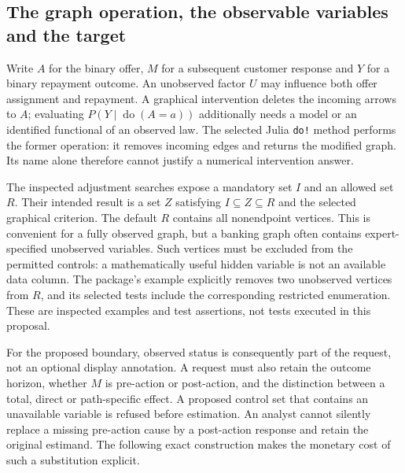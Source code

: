 \subsection{The graph operation, the observable variables and the target}
\label{exec19:otherid-graph}
Write $A$ for the binary offer, $M$ for a subsequent customer response and $Y$
for a binary repayment outcome. An unobserved factor $U$ may influence both
offer assignment and repayment. A graphical intervention deletes the incoming
arrows to $A$; evaluating $P(Y\mid\operatorname{do}(A=a))$ additionally needs
a model or an identified functional of an observed law. The selected Julia
\texttt{do!} method performs the former operation: it removes incoming edges
and returns the modified graph. Its name alone therefore cannot justify a
numerical intervention answer.~\citep{exec19_otherid_julia}

The inspected adjustment searches expose a mandatory set $I$ and an allowed
set $R$. Their intended result is a set $Z$ satisfying $I\subseteq Z\subseteq R$
and the selected graphical criterion. The default $R$ contains all nonendpoint
vertices. This is convenient for a fully observed graph, but a banking graph
often contains expert-specified unobserved variables. Such vertices must be
excluded from the permitted controls: a mathematically useful hidden variable
is not an available data column. The package's example explicitly removes two
unobserved vertices from $R$, and its selected tests include the corresponding
restricted enumeration. These are inspected examples and test assertions, not
tests executed in this proposal.~\citep{exec19_otherid_julia}

For the proposed boundary, observed status is consequently part of the request,
not an optional display annotation. A request must also retain the outcome
horizon, whether $M$ is pre-action or post-action, and the distinction between a
total, direct or path-specific effect. A proposed control set that contains an
unavailable variable is refused before estimation. An analyst cannot silently
replace a missing pre-action cause by a post-action response and retain the
original estimand. The following exact construction makes the monetary cost of
such a substitution explicit.~\citep{exec19_otherid_reference}

